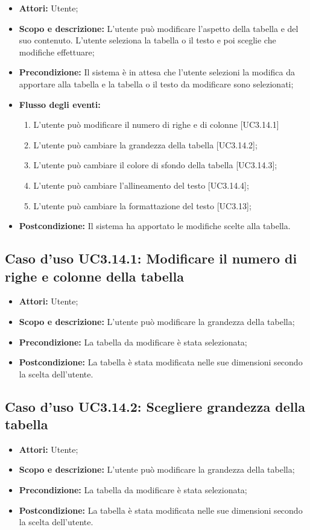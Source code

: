 \begin{itemize}
	\item \textbf{Attori:} Utente;
	\item \textbf{Scopo e descrizione:} L'utente può modificare l'aspetto della tabella e del suo contenuto. L'utente seleziona la tabella o il testo e poi sceglie che modifiche effettuare;
	\item \textbf{Precondizione:} Il sistema è in attesa che l'utente selezioni la modifica da apportare alla tabella e la tabella o il testo da modificare sono selezionati;
	\item \textbf{Flusso degli eventi:}
	\begin{enumerate}
		\item L'utente può modificare il numero di righe e di colonne [UC3.14.1]
		\item L'utente può cambiare la grandezza della tabella [UC3.14.2];
		\item L'utente può cambiare il colore di sfondo della tabella [UC3.14.3];
		\item L'utente può cambiare l'allineamento del testo [UC3.14.4];
		\item L'utente può cambiare la formattazione del testo [UC3.13];
	\end{enumerate}
	\item \textbf{Postcondizione:} Il sistema ha apportato le modifiche scelte alla tabella.
\end{itemize}

\subsection{Caso d'uso UC3.14.1: Modificare il numero di righe e colonne della tabella}
\begin{itemize}
	\item \textbf{Attori:} Utente;
	\item \textbf{Scopo e descrizione:} L'utente può modificare la grandezza della tabella;
	\item \textbf{Precondizione:} La tabella da modificare è stata selezionata;
	\item \textbf{Postcondizione:} La tabella è stata modificata nelle sue dimensioni secondo la scelta dell'utente.
\end{itemize}

\subsection{Caso d'uso UC3.14.2: Scegliere grandezza della tabella}
\begin{itemize}
	\item \textbf{Attori:} Utente;
	\item \textbf{Scopo e descrizione:} L'utente può modificare la grandezza della tabella;
	\item \textbf{Precondizione:} La tabella da modificare è stata selezionata;
	\item \textbf{Postcondizione:} La tabella è stata modificata nelle sue dimensioni secondo la scelta dell'utente.
\end{itemize}


